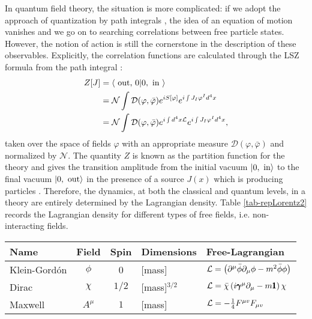 In quantum field theory, the situation is more complicated: if we adopt the approach of quantization by path integrals \cite{martinez2002,Weinberg}, the idea of an equation of motion vanishes and we go on to searching correlations between free particle states. However, the notion of action is still the cornerstone in the description of these observables.
Explicitly, the correlation functions are calculated through the LSZ formula from the path integral \cite{greiner1996qft,peskin}:
\begin{equation}
	\begin{aligned}
		Z[J]&=\braket{\text { out, } 0| 0, \text { in }}
		\\&=\mathcal{N}\int \mathcal{D}(\varphi, \bar{\varphi})  e^{i S[\varphi]} e^{i \int J_I\varphi^I  d^{4} x}
		\\&=\mathcal{N}\int \mathcal{D}(\varphi, \bar{\varphi})  e^{i \int d^{4} x \mathcal{L}} e^{i \int J_I\varphi^I  d^{4} x},
	\end{aligned}
\end{equation}
taken over the space of fields $\varphi$ with an appropriate measure $\mathcal{D}(\varphi, \bar{\varphi})$ and normalized by $\mathcal{N}$. The quantity $Z$ is known as the partition function for the theory and gives the transition amplitude from the initial vacuum $\ket{0,\text{ in}}$ to the final vacuum $\ket{0,\text{ out}}$ in the presence of a source $J(x)$ which is producing particles \cite{birrell75900}. Therefore, the dynamics, at both the classical and quantum levels, in a theory are entirely determined by the Lagrangian density. Table \ref{tab-repLorentz2} records the Lagrangian density for different types of free fields, i.e. non-interacting fields.

\begin{center}
	\begin{tabular}{|l|c|c|l|l|}\hline\bigstrut
		Name							& Field				& Spin & Dimensions & Free-Lagrangian	\\\hline\hline\bigstrut
		Klein-Gordón				&	$\phi$					& 0			&[mass]					&	$\lag=\fac{\partial^\mu\bar \phi\partial_\mu \phi-m^2 \bar \phi\phi}$						\\\hline\bigstrut
		Dirac								& $\chi$			& $1/2$	&[mass]$^{3/2}$	&$\lag=\bar\chi\fac{i\pmb\gamma^\mu \partial_\mu -m\pmb 1}\chi$\\\hline\bigstrut
		Maxwell	& $A^\mu$ 		& $1$		&[mass]					&$\mathcal{L}=-\frac{1}{4} F^{\mu v} F_{\mu v} $\\\hline
	\end{tabular}
	\label{tab-repLorentz2}
\end{center}

